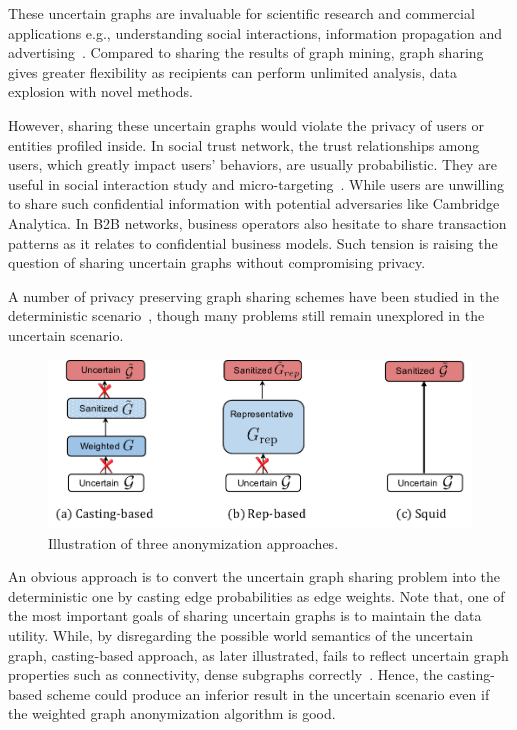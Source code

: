 These uncertain graphs are invaluable for scientific research and commercial applications e.g., understanding social interactions, information propagation and advertising~\cite{Kempe_Maximizing_2003,Cho_Friendship_2011}. 
Compared to sharing the results of graph mining, graph sharing gives greater flexibility as recipients can perform unlimited analysis, data explosion with novel methods.

However, sharing these uncertain graphs would violate the privacy of users or entities profiled inside. In social trust network, the trust relationships among users, which greatly impact users' behaviors, are usually probabilistic.  They are useful in social interaction study and micro-targeting~\cite{Kempe_Maximizing_2003}. While users are unwilling to share such confidential information with potential adversaries like Cambridge Analytica. In B2B networks, business operators also hesitate to share transaction patterns as it relates to confidential business models. Such tension is raising the question of sharing uncertain graphs without compromising privacy. 

A number of privacy preserving graph sharing schemes have been studied in the deterministic scenario~\cite{Liu_Towards_2008,Ying_Randomizing_2008,Wang2011,Liu_Privacy_2009,Nguyen_Anonymizing_2015,Sala_Sharing_2011,Xiao_Differentially_2014,lee2011}, though many problems still remain unexplored in the uncertain scenario.
\begin{figure}[!htb]
  \centering
  \includegraphics[width=0.9\linewidth]{ill/methods.pdf}
  \caption{Illustration of three anonymization approaches.}
\end{figure}

An obvious approach is to convert the uncertain graph sharing problem into the deterministic one by casting edge probabilities as edge weights. 
Note that, one of the most important goals of sharing uncertain graphs is to maintain the data utility. 
While, by disregarding the possible world semantics of the uncertain graph, casting-based approach, as later illustrated, fails to reflect uncertain graph properties such as connectivity, dense subgraphs correctly~\cite{Zhao_Detecting_2014,Hua_Probabilistic_2010}. 
Hence, the casting-based scheme could produce an inferior result in the uncertain scenario even if the weighted graph anonymization algorithm is good. 

